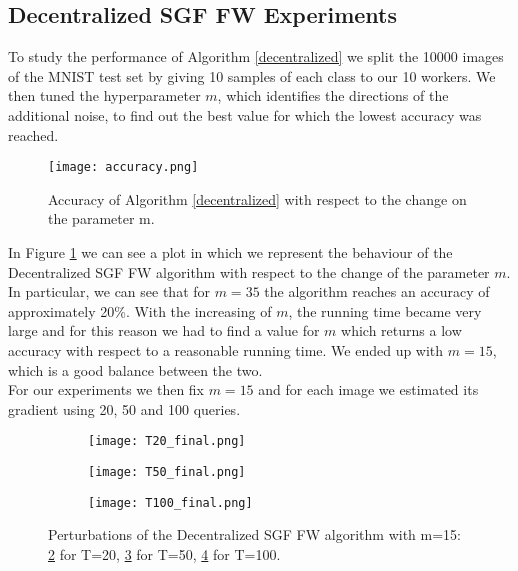 \subsection{Decentralized SGF FW Experiments}
To study the performance of Algorithm \ref{decentralized} we split the 10000 images of the MNIST test set by giving 10 samples of each class to our 10 workers.
We then tuned the hyperparameter $m$, which identifies the directions of the additional noise, to find out the best value for which the lowest accuracy was reached.
\begin{figure}[htbp]
	\centering
	\texttt{[image: accuracy.png]}
	\caption{Accuracy of Algorithm \ref{decentralized} with respect to the change on the parameter m.}
	\label{fig:accuracy}
\end{figure}
In Figure \ref{fig:accuracy} we can see a plot in which we represent the behaviour of the Decentralized SGF FW algorithm  with respect to the change of the parameter $m$. In particular, we can see that for $m=35$ the algorithm reaches an accuracy of approximately 20\%. With the increasing of $m$, the running time became very large and for this reason we had to find a value for $m$ which returns a low accuracy with respect to a reasonable running time. We ended up with $m=15$, which is a good balance between the two.\\
For our experiments we then fix $m=15$ and for each image we estimated its gradient using 20, 50 and 100 queries.

\begin{figure}[h]
	\centering
	\begin{subfigure}[b]{0.15\textwidth}
		\centering
		\texttt{[image: T20\_final.png]}
		\caption{}
		\label{fig:decentralized_perturbation_20}
	\end{subfigure}
	\hfill
	\begin{subfigure}[b]{0.15\textwidth}
		\texttt{[image: T50\_final.png]}
		\caption{}
		\label{fig:decentralized_perturbation_50}
	\end{subfigure}
	\hfill
	\begin{subfigure}[b]{0.15\textwidth}
		\texttt{[image: T100\_final.png]}
		\caption{}
		\label{fig:decentralized_perturbation_100}
	\end{subfigure}
	\caption{Perturbations of the Decentralized SGF FW algorithm with m=15: \ref{fig:decentralized_perturbation_20} for T=20, \ref{fig:decentralized_perturbation_50} for T=50,  \ref{fig:decentralized_perturbation_100} for T=100.}
	\label{fig:decentralized_perturbations}
\end{figure}

